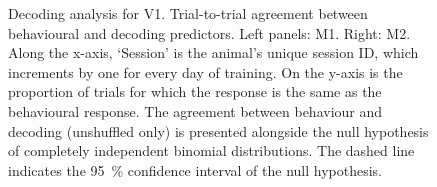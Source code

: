 \begin{figure}[htbp]
    \centering
    \hspace*{\fill}
    \hspace*{\fill}\hspace{.2cm}\hspace*{\fill}
    \hspace*{\fill}
    \caption{%
    Decoding analysis for \ac{V1}.
    Trial-to-trial agreement between behavioural and decoding predictors.
    Left panels: \ac{M1}. Right: \ac{M2}.
	Along the x-axis, `Session' is the animal's unique session ID, which increments by one for every day of training.
    On the y-axis is the proportion of trials for which the response is the same as the behavioural response.
    The agreement between behaviour and decoding (unshuffled only) is presented alongside the null hypothesis of completely independent binomial distributions.
    The dashed line indicates the \SI{95}{\percent} confidence interval of the null hypothesis.
}
    \label{fig:decag_all_v1}
\end{figure}


